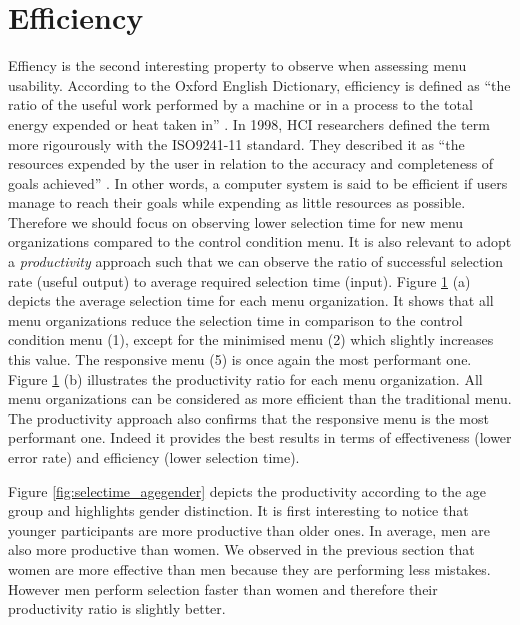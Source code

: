 \section{Efficiency}
Effiency is the second interesting property to observe when assessing menu 
usability. According to the Oxford English Dictionary, efficiency is defined as 
\enquote{the ratio of the useful work performed by a machine or in a process to 
the total energy expended or heat taken in} \cite{efficiency}. In 1998, HCI 
researchers defined the term more rigourously with the ISO9241-11 standard. 
They described it as \enquote{the resources expended by the user in relation to 
the 
accuracy and completeness of goals achieved} \cite{iso}. In other 
words, a computer system is said to be efficient if users manage to reach 
their goals while expending as little resources as possible. Therefore we 
should 
focus on observing lower selection time for new menu organizations compared to 
the 
control condition menu. It is also relevant to adopt a \textit{productivity} 
approach such that we can observe the ratio of successful selection rate 
(useful output) to average required selection time (input). Figure 
\ref{fig:selectime} (a) depicts the average selection time for 
each menu organization. It shows that all menu organizations reduce the 
selection time in comparison to the control condition menu (1), except for the 
minimised menu (2) which slightly increases this value. The responsive 
menu (5) is once again the most performant one. Figure 
\ref{fig:selectime} (b) illustrates the productivity ratio for each menu 
organization. All menu organizations can be considered as more efficient than 
the traditional menu. The productivity approach also confirms that the 
responsive menu is the most performant one. Indeed it provides the best results 
in terms of effectiveness (lower error rate) and efficiency (lower selection 
time).

\begin{figure}[!ht]
    
    \label{fig:selectime}
\end{figure}

Figure \ref{fig:selectime_agegender} depicts the productivity according 
to the age group and highlights gender distinction. It is first 
interesting to notice that younger participants are more productive 
than older ones. In average, men are also more productive than women. We 
observed in the previous section that women are more effective than men 
because they are performing less mistakes. However men perform selection 
faster than women and therefore their productivity ratio is slightly 
better.

